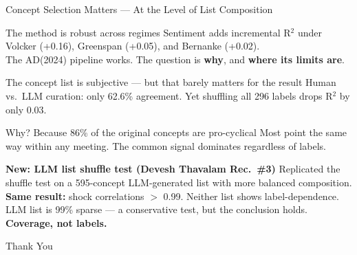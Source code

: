 \documentclass[10pt,aspectratio=169]{beamer}
\begin{document}
\begin{frame}{Concept Selection Matters --- At the Level of List Composition}
  \vspace{6pt}
  \begin{block}{The method is robust across regimes}
    \centering\small
    Sentiment adds incremental R$^2$ under Volcker (+0.16), Greenspan (+0.05), and Bernanke (+0.02).\\
    The AD(2024) pipeline works. The question is \textbf{why}, and \textbf{where its limits are}.
  \end{block}
  \vspace{6pt}
  \begin{block}{The concept list is subjective --- but that barely matters for the result}
    \centering\small
    Human vs.\ LLM curation: only 62.6\% agreement. Yet shuffling all 296 labels drops R$^2$ by only 0.03.
  \end{block}
  \vspace{6pt}
  \begin{block}{Why? Because 86\% of the original concepts are pro-cyclical}
    \centering\small
    Most point the same way within any meeting. The common signal dominates regardless of labels.
  \end{block}
  \vspace{6pt}
  \begin{block}{\textbf{New: LLM list shuffle test (Devesh Thavalam Rec.\ \#3)}}
    \centering\small
    Replicated the shuffle test on a 595-concept LLM-generated list with more balanced composition.\\
    \textbf{Same result:} shock correlations $>$ 0.99. Neither list shows label-dependence.\\
    LLM list is 99\% sparse --- a conservative test, but the conclusion holds. \textbf{Coverage, not labels.}
  \end{block}
\end{frame}

{
\begin{frame}[plain]
  \vspace{3cm}
  \begin{center}
    {\Huge Thank You}
  \end{center}
\end{frame}
}
\end{document}
